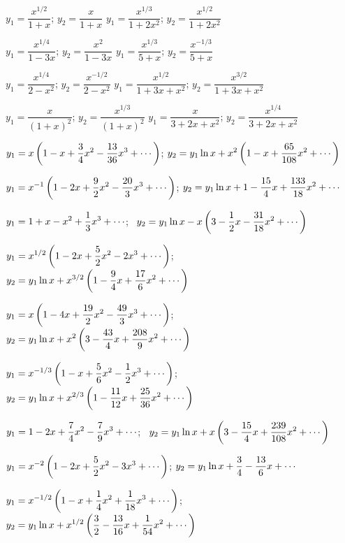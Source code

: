  $y_1=\dfrac{x^{1/2}}{1+x}$;   $y_2=\dfrac{x}{1+x}$
 $y_1=\dfrac{x^{1/3}}{1+2x^2}$;   $y_2=\dfrac{x^{1/2}}{1+2x^2}$

 $y_1=\dfrac{x^{1/4}}{1-3x}$;   $y_2=\dfrac{x^2}{1-3x}$
 $y_1=\dfrac{x^{1/3}}{5+x}$;   $y_2=\dfrac{x^{-1/3}}{5+x}$

 $y_1=\dfrac{x^{1/4}}{2-x^2}$;   $y_2=\dfrac{x^{-1/2}}{2-x^2}$
 $y_1=\dfrac{x^{1/2}}{1+3x+x^2}$;    $y_2=\dfrac{x^{3/2}}{1+3x+x^2}$

 $y_1=\dfrac{x}{(1+x)^2}$;   $y_2=\dfrac{x^{1/3}}{(1+x)^2}$
 $y_1=\dfrac{x}{3+2x+x^2}$;   $y_2=\dfrac{x^{1/4}}{3+2x+x^2}$


$\displaystyle{y_1=x\left(1-x+\frac{3}{4}x^2-\frac{13}{36}x^3+\cdots\right)}$;\;
$\displaystyle{y_2=y_1 \ln x + x^2\left(1-x+\frac{65}{108}x^2+
\cdots\right)}$

$\displaystyle{y_1=x^{-1}\left(1-2x+\frac{9}{2}x^2-\frac{20}{3}x^3+\cdots\right)}$;\;
$\displaystyle{y_2=
y_1\ln x+1-\frac{15}{4}x+\frac{133}{18}x^2+\cdots}$

$\displaystyle{y_1=1+x-x^2+\frac{1}{3}x^3+\cdots}$;\;  \,
$\displaystyle{y_2=
y_1\ln x-x\left(3-\frac{1}{2}x-\frac{31}{18}x^2+\cdots\right)}$

$\displaystyle{y_1=x^{1/2}\left(1-2x+\frac{5}{2}x^2-2x^3+\cdots\right)}$;\;
$\displaystyle{y_2=
y_1\ln x+x^{3/2}\left(1-\frac{9}{4}x+\frac{17}{6}x^2+
\cdots\right)}$

$\displaystyle{y_1=x\left(1-4x+\frac{19}{2}x^2-\frac{49}{3}x^3+\cdots\right)}$;\;
$\displaystyle{y_2=
y_1\ln x+x^2\left(3-\frac{43}{4}x+\frac{208}{9}x^2+\cdots
\right)}$

$\displaystyle{y_1=x^{-1/3}\left(1-x+\frac{5}{6}x^2-\frac{1}{2}x^3+\cdots\right)}$;\;
$\displaystyle{y_2=
y_1\ln x+x^{2/3}\left(1-\frac{11}{12}x+\frac{25}{36}x^2+
\cdots\right)}$

$\displaystyle{y_1=1-2x+\frac{7}{4}x^2-\frac{7}{9}x^3+\cdots}$;\;   \,
$\displaystyle{y_2=
y_1\ln x+x\left(3-\frac{15}{4}x+\frac{239}{108}x^2+\cdots
\right)}$

$\displaystyle{y_1=x^{-2}\left(1-2x+\frac{5}{2}x^2-3x^3+\cdots\right)}$;\;
$\displaystyle{y_2=y_1\ln x+\frac{3}{4}-\frac{13}{6}x+\cdots}$

$\displaystyle{y_1=x^{-1/2}\left(1-x+\frac{1}{4}x^2+\frac{1}{18}x^3+\cdots\right)}$;\;
$\displaystyle{y_2=y_1\ln x+x^{1/2}\left(\frac{3}{2}-\frac{13}{16}x
+\frac{1}{54}x^2+\cdots\right)}$


